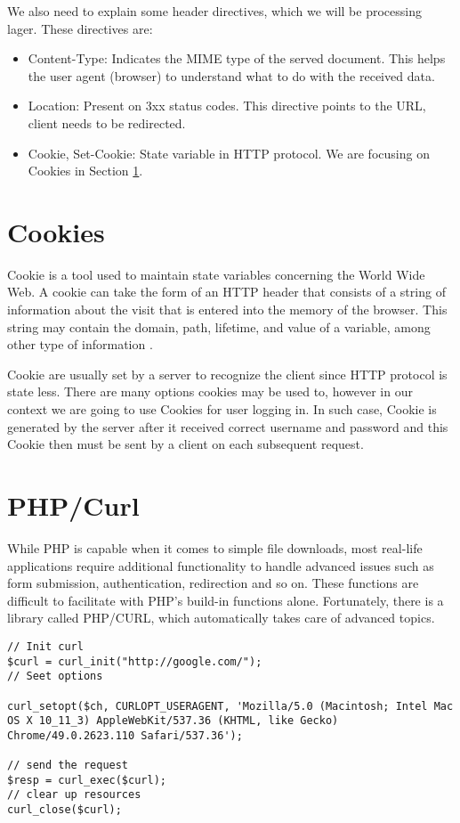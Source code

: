 We also need to explain some header directives, which we will be processing lager. These directives are:

\begin{itemize}
\item Content-Type: Indicates the MIME type of the served document. This helps the user agent (browser) to understand what to do with the received data. \cite{mozzila}
\item Location: Present on 3xx status codes. This directive points to the URL, client needs to be redirected.
\item Cookie, Set-Cookie: State variable in HTTP protocol. We are focusing on Cookies in Section \ref{sec:cookies}.
\end{itemize}


\section{Cookies}
\label{sec:cookies}
Cookie is a tool used to maintain state variables concerning the World Wide Web. A cookie can take the form of an HTTP header that consists of a string of information about the visit that is entered into the memory of the browser. This string may contain the domain, path, lifetime, and value of a variable, among other type of information \cite{reiche2000http}.

Cookie are usually set by a server to recognize the client since HTTP protocol is state less. There are many options cookies may be used to, however in our context we are going to use Cookies for user logging in. In such case, Cookie is generated by the server after it received correct username and password and this Cookie then must be sent by a client on each subsequent request.


\section{PHP/Curl}
While PHP is capable when it comes to simple file downloads, most real-life applications require additional functionality to handle advanced issues such as form submission, authentication, redirection and so on. These functions are difficult to facilitate with PHP's build-in functions alone. Fortunately, there is a library called PHP/CURL, which automatically takes care of advanced topics.  \cite{curl} 


\begin{lstlisting}[caption={Example of PHP/Curl usage},label={lst:phpcurl}]
// Init curl
$curl = curl_init("http://google.com/");
// Seet options

curl_setopt($ch, CURLOPT_USERAGENT, 'Mozilla/5.0 (Macintosh; Intel Mac OS X 10_11_3) AppleWebKit/537.36 (KHTML, like Gecko) Chrome/49.0.2623.110 Safari/537.36');

// send the request
$resp = curl_exec($curl);
// clear up resources
curl_close($curl);
\end{lstlisting}

